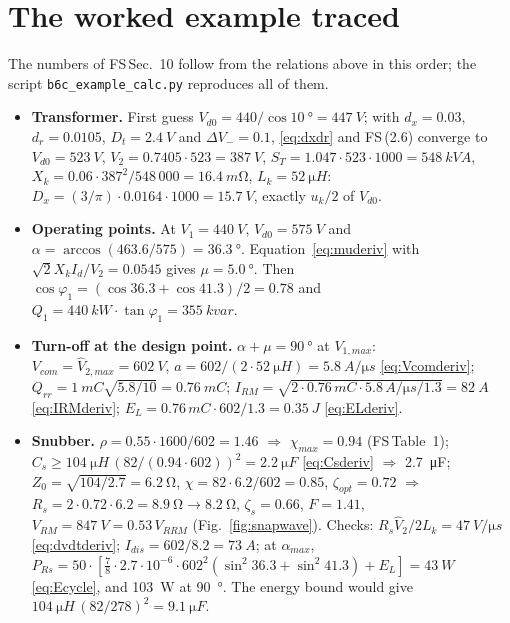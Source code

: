 \documentclass[10pt,a4paper]{scrartcl}
\newcommand{\Vdo}{V_{d0}}
\newcommand{\Id}{I_{d}}
\newcommand{\Vll}{V_{2}}
\newcommand{\Xk}{X_{k}}
\newcommand{\Lk}{L_{k}}
\newcommand{\uk}{u_{k}}
\newcommand{\Dx}{D_{x}}
\newcommand{\Dt}{D_{t}}
\newcommand{\VRRM}{V_{RRM}}
\newcommand{\fs}[1]{\textsf{FS}\,(#1)}
\newcommand{\fssec}[1]{\textsf{FS}\,Sec.~#1}
\newcommand{\fstab}[1]{\textsf{FS}\,Table~#1}
\begin{document}
\section{The worked example traced}\label{sec:example}
The numbers of \fssec{10} follow from the relations above in this order; the script \texttt{b6c\_example\_calc.py} reproduces all of them.
\begin{itemize}[leftmargin=*]
\item \textbf{Transformer.} First guess $\Vdo = 440/\cos\SI{10}{\degree} = \SI{447}{V}$; with $d_x = 0.03$, $d_r = 0.0105$, $\Dt = \SI{2.4}{V}$ and $\Delta V_- = 0.1$, \eqref{eq:dxdr} and \fs{2.6} converge to $\Vdo = \SI{523}{V}$, $\Vll = 0.7405\cdot523 = \SI{387}{V}$, $S_T = 1.047\cdot523\cdot1000 = \SI{548}{kVA}$, $\Xk = 0.06\cdot387^2/548\,000 = \SI{16.4}{m\ohm}$, $\Lk = \SI{52}{\micro H}$: $\Dx = (3/\pi)\cdot0.0164\cdot1000 = \SI{15.7}{V}$, exactly $\uk/2$ of $\Vdo$.
\item \textbf{Operating points.} At $V_1 = \SI{440}{V}$, $\Vdo = \SI{575}{V}$ and $\alpha = \arccos(463.6/575) = \SI{36.3}{\degree}$. Equation~\eqref{eq:muderiv} with $\sqrt2\Xk\Id/\Vll = 0.0545$ gives $\mu = \SI{5.0}{\degree}$. Then $\cos\varphi_1 = (\cos36.3+\cos41.3)/2 = 0.78$ and $Q_1 = \SI{440}{kW}\cdot\tan\varphi_1 = \SI{355}{kvar}$.
\item \textbf{Turn-off at the design point.} $\alpha+\mu = \SI{90}{\degree}$ at $V_{1,max}$: $V_{com} = \hat V_{2,max} = \SI{602}{V}$, $a = 602/(2\cdot\SI{52}{\micro H}) = \SI{5.8}{A/\micro s}$ \eqref{eq:Vcomderiv}; $Q_{rr} = \SI{1}{mC}\sqrt{5.8/10} = \SI{0.76}{mC}$; $I_{RM} = \sqrt{2\cdot0.76\,\si{mC}\cdot5.8\,\si{A/\micro s}/1.3} = \SI{82}{A}$ \eqref{eq:IRMderiv}; $E_L = 0.76\,\si{mC}\cdot602/1.3 = \SI{0.35}{J}$ \eqref{eq:ELderiv}.
\item \textbf{Snubber.} $\rho = 0.55\cdot1600/602 = 1.46$ $\Rightarrow$ $\chi_{max} = 0.94$ (\fstab{1}); $C_s\ge\SI{104}{\micro H}\,(82/(0.94\cdot602))^2 = \SI{2.2}{\micro F}$ \eqref{eq:Csderiv} $\Rightarrow$ \SI{2.7}{\micro F}; $Z_0 = \sqrt{104/2.7} = \SI{6.2}{\ohm}$, $\chi = 82\cdot6.2/602 = 0.85$, $\zeta_{opt} = 0.72$ $\Rightarrow$ $R_s = 2\cdot0.72\cdot6.2 = \SI{8.9}{\ohm}\to\SI{8.2}{\ohm}$, $\zeta_s = 0.66$, $F = 1.41$, $V_{RM} = \SI{847}{V} = 0.53\,\VRRM$ (Fig.~\ref{fig:snapwave}). Checks: $R_s\hat V_2/2\Lk = \SI{47}{V/\micro s}$ \eqref{eq:dvdtderiv}; $I_{dis} = 602/8.2 = \SI{73}{A}$; at $\alpha_{max}$, $P_{Rs} = 50\cdot[\tfrac78\cdot2.7\cdot10^{-6}\cdot602^2(\sin^2\!36.3+\sin^2\!41.3) + E_L] = \SI{43}{W}$ \eqref{eq:Ecycle}, and \SI{103}{W} at \SI{90}{\degree}. The energy bound would give $\SI{104}{\micro H}\,(82/278)^2 = \SI{9.1}{\micro F}$.

\end{itemize}
\end{document}
